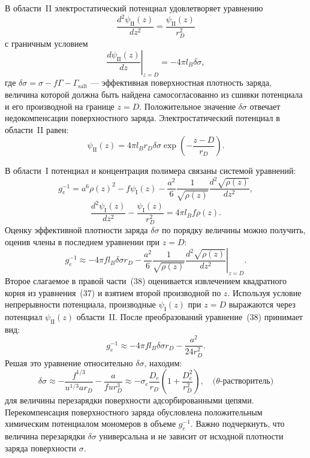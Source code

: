 \documentclass[12pt,a4paper]{article}
\begin{document}
В области~II электростатический потенциал удовлетворяет уравнению
\begin{equation}
\frac{d^2\psi_{\text{II}}(z)}{dz^2} = \frac{\psi_{\text{II}}(z)}{r_D^2}
\end{equation}
с граничным условием
\begin{equation}
\left.\frac{d\psi_{\text{II}}(z)}{dz}\right|_{z=D} = -4\pi l_B \delta\sigma,
\end{equation}
где $\delta\sigma = \sigma - f\Gamma - \Gamma_{\text{salt}}$ --- эффективная поверхностная плотность заряда, величина которой должна быть найдена самосогласованно из сшивки потенциала и его производной на границе $z = D$. Положительное значение $\delta\sigma$ отвечает недокомпенсации поверхностного заряда. Электростатический потенциал в области~II равен:
\begin{equation}
\psi_{\text{II}}(z) = 4\pi l_B r_D \delta\sigma \exp\left( -\frac{z - D}{r_D} \right).
\end{equation}

В области~I потенциал и концентрация полимера связаны системой уравнений:
\begin{equation}
g_e^{-1} = a^6 \rho(z)^2 - f \psi_{\text{I}}(z) - \frac{a^2}{6}\frac{1}{\sqrt{\rho(z)}}\frac{d^2\sqrt{\rho(z)}}{dz^2},
\end{equation}
\begin{equation}
\frac{d^2\psi_{\text{I}}(z)}{dz^2} - \frac{\psi_{\text{I}}(z)}{r_D^2} = 4\pi l_B f \rho(z).
\end{equation}
Оценку эффективной плотности заряда $\delta\sigma$ по порядку величины можно получить, оценив члены в последнем уравнении при $z = D$:
\begin{equation}
g_e^{-1} \approx -4\pi f l_B \delta\sigma r_D - \left. \frac{a^2}{6}\frac{1}{\sqrt{\rho(z)}}\frac{d^2\sqrt{\rho(z)}}{dz^2} \right|_{z=D}.
\end{equation}
Второе слагаемое в правой части~(38) оценивается извлечением квадратного корня из уравнения~(37) и взятием второй производной по $z$. Используя условие непрерывности потенциала, производные $\psi_{\text{I}}(z)$ при $z = D$ выражаются через потенциал $\psi_{\text{II}}(z)$ области~II. После преобразований уравнение~(38) принимает вид:
\begin{equation}
g_e^{-1} \approx -4\pi f l_B \delta\sigma r_D - \frac{a^2}{24 r_D^2}.
\end{equation}
Решая это уравнение относительно $\delta\sigma$, находим:
\begin{equation}
\delta\sigma \approx -\frac{f^{1/3}}{u^{1/3} a r_D} - \frac{a}{f u r_D^3} \approx -\sigma_e \frac{D_e}{r_D} \left( 1 + \frac{D_e^2}{r_D^2} \right), \quad \text{($\theta$-растворитель)}
\end{equation}
для величины перезарядки поверхности адсорбированными цепями. Перекомпенсация поверхностного заряда обусловлена положительным химическим потенциалом мономеров в объеме $g_e^{-1}$. Важно подчеркнуть, что величина перезарядки $\delta\sigma$ универсальна и не зависит от исходной плотности заряда поверхности $\sigma$.
\end{document}
